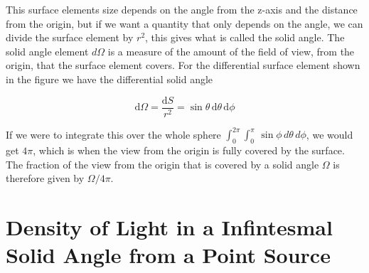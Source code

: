 This surface elements size depends on the angle from the z-axis and the distance from the origin, but if we want a quantity that only depends on the angle, we can divide the surface element by $r^2$, this gives what is called the solid angle.
The solid angle element $d\Omega$ is a measure of the amount of the field of view, from the origin, that the surface element covers. For the differential surface element shown in the figure we have the differential solid angle

\begin{equation} \label{eq: solid angle}
	\mathrm{d}\Omega = \frac{\mathrm{d}S}{r^2} = \sin\theta \,\mathrm{d}\theta \,\mathrm{d}\phi
\end{equation}

If we were to integrate this over the whole sphere $ \int_{0}^{2\pi} \int_{0}^{\pi} \, \sin \phi \, d\theta \, d\phi$, we would get $4\pi$, which is when the view from the origin is fully covered by the surface.
The fraction of the view from the origin that is covered by a solid angle $\Omega$ is therefore given by $\Omega/ 4\pi$.




\section{Density of Light in a Infintesmal Solid Angle from a Point Source}\label{sect: Intensity of Light per differential solid angle from a Point Source}

